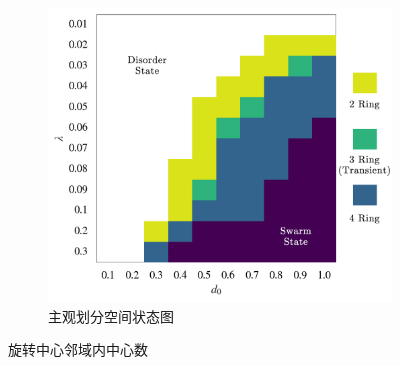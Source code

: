 \documentclass{article}
\begin{document}
\begin{figure}[H]
\begin{subfigure}[b]{0.49\textwidth}
	\end{subfigure}
	\begin{subfigure}[b]{0.49\textwidth}
		\includegraphics[width=\textwidth]{./figs/subjectiveOpRing.png}
		\vspace{-1cm}
		\caption{主观划分空间状态图}
	\end{subfigure}
	\vspace{-0.5cm}
	\caption{旋转中心邻域内中心数}
	\label{fig:fig234c.7.1}
\end{figure}



		
\end{document}

